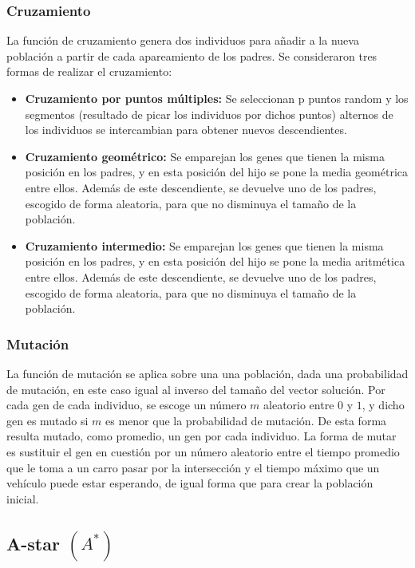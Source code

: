 \documentclass[colorinlistoftodos,twoside,twocolumn]{article} %
\begin{document}
	\subsubsection{Cruzamiento}
	
	La funci\'on de cruzamiento genera dos individuos para a\~nadir a la nueva poblaci\'on a partir de cada apareamiento de los padres. Se consideraron tres formas de realizar el cruzamiento:
	\begin{itemize}
		\item  \textbf{Cruzamiento por puntos m\'ultiples:} Se seleccionan p puntos random y los segmentos (resultado de picar los individuos por dichos puntos) alternos de los individuos se intercambian para obtener nuevos descendientes.
		\item \textbf{Cruzamiento geom\'etrico:} Se emparejan los genes que tienen la misma posici\'on en los padres, y en esta posici\'on del hijo se pone la media geom\'etrica entre ellos. Adem\'as de este descendiente, se devuelve uno de los padres, escogido de forma aleatoria, para que no disminuya el tama\~no de la poblaci\'on. 
		\item \textbf{Cruzamiento intermedio:} Se emparejan los genes que tienen la misma posici\'on en los padres, y en esta posici\'on del hijo se pone la media aritm\'etica entre ellos. Adem\'as de este descendiente, se devuelve uno de los padres, escogido de forma aleatoria, para que no disminuya el tama\~no de la poblaci\'on. 
	\end{itemize}
	
	\subsubsection{Mutación}
	
	La funci\'on de mutaci\'on se aplica sobre una una poblaci\'on, dada una probabilidad de mutaci\'on, en este caso igual al inverso del tama\~no del vector soluci\'on. Por cada gen de cada individuo, se escoge un n\'umero $ m $ aleatorio entre $ 0 $ y $ 1 $, y dicho gen es mutado si $ m $ es menor que la probabilidad de mutaci\'on. De esta forma resulta mutado,  como promedio, un gen por cada individuo. La forma de mutar es sustituir el gen en cuesti\'on por un n\'umero aleatorio entre el tiempo promedio que le toma a un carro pasar por la intersección y el tiempo máximo que un vehículo puede estar esperando, de igual forma que para crear la poblaci\'on inicial.
	
	
	\subsection{A-star $(A^{*}) $}
	
\end{document}
